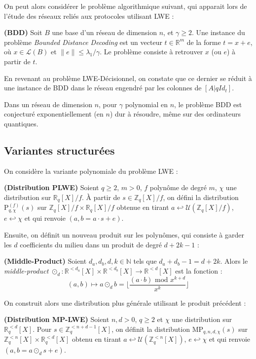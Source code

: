 \documentclass[11pt,a4paper]{article}
\begin{document}
On peut alors considérer le problème algorithmique suivant, qui apparait lors de l'étude des réseaux reliés aux protocoles utilisant LWE : 

\begin{defin}\textbf{(BDD)}
Soit $B$ une base d'un réseau de dimension $n$, et $\gamma \geq 2$. Une instance du problème \textit{Bounded Distance Decoding} est un vecteur $t \in \mathbb{R}^m$ de la forme $t=x+e$, où $x\in \mathcal{L}(B)$ et $\|e\| \leq \lambda_1/\gamma$. Le problème consiste à retrouver $x$ (ou $e$) à partir de $t$.
\end{defin}

En revenant au problème LWE-Décisionnel, on constate que ce dernier se réduit à une instance de BDD dans le réseau engendré par les colonnes de $[A|qId_t]$.

\begin{conj}
Dans un réseau de dimension $n$, pour $\gamma$ polynomial en $n$, le problème BDD est conjecturé exponentiellement (en $n$) dur à résoudre, même sur des ordinateurs quantiques.
\end{conj}

\subsection{Variantes structurées}

On considère la variante polynomiale du problème LWE :
\begin{defin}\textbf{(Distribution PLWE)}
Soient $q \geq 2$, $m>0$, $f$ polynôme de degré $m$, $\chi$ une distribution sur $\mathbb{R}_q[X]/f$. À partir de $s\in \mathbb{Z}_q[X]/f$, on défini la distribution $\text{P}^{(f)}_{q,\chi}(s)$ sur $\mathbb{Z}_q[X]/f \times \mathbb{R}_q[X]/f$ obtenue en tirant $a \hookleftarrow \mathcal{U}(\mathbb{Z}_q[X]/f)$, $e\hookleftarrow \chi$ et qui renvoie $(a,b=a\cdot s+e)$.
\end{defin}

Ensuite, on définit un nouveau produit sur les polynômes, qui consiste à garder les $d$ coefficients du milieu dans un produit de degré $d+2k-1$ : 
\begin{defin}\textbf{(Middle-Product)}
Soient $d_a,d_b,d,k \in \mathbb{N}$ tels que $d_a+d_b-1=d+2k$. Alors le \textit{middle-product} $\odot_d : \mathbb{R}^{<d_a}[X]\times\mathbb{R}^{<d_b}[X]\to\mathbb{R}^{<d}[X]$ est la fonction :
\[(a,b) \mapsto a \odot_d b = \lfloor \frac{(a\cdot b)\text{ mod }x^{k+d}}{x^k} \rfloor\]
\end{defin}
On construit alors une distribution plus générale utilisant le produit précédent : 
\begin{defin}\textbf{(Distribution MP-LWE)}
Soient $n,d >0$, $q\geq 2$ et $\chi$ une distribution sur $\mathbb{R}_q^{<d}[X]$. Pour $s\in \mathbb{Z}_q^{<n+d-1}[X]$, on définit la distribution $\text{MP}_{q,n,d,\chi}(s)$ sur $\mathbb{Z}_q^{<n}[X]\times\mathbb{R}_q^{<d}[X]$ obtenu en tirant $a \hookleftarrow \mathcal{U}(\mathbb{Z}_q^{<n}[X])$, $e\hookleftarrow \chi$ et qui renvoie $(a,b=a\odot_d s+e)$. 
\end{defin}
\end{document}
